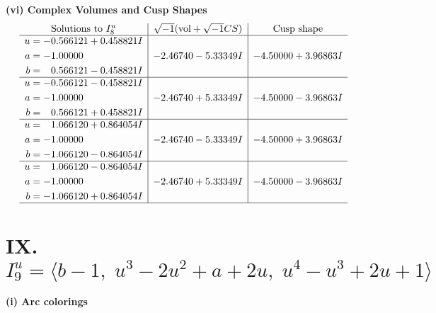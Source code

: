 \documentclass[1p]{elsarticle_modified}
\theoremstyle{definition}
\newcommand{\I}{\sqrt{-1}}
\begin{document}
\newpage\flushleft \textbf{(vi) Complex Volumes and Cusp Shapes}
$$\begin{array}{c|c|c}  
\text{Solutions to }I^u_{8}& \I (\text{vol} + \sqrt{-1}CS) & \text{Cusp shape}\\
 \hline 
\begin{aligned}
u &= -0.566121 + 0.458821 I \\
a &= -1.00000\phantom{ +0.000000I} \\
b &= \phantom{-}0.566121 - 0.458821 I\end{aligned}
 & -2.46740 - 5.33349 I & -4.50000 + 3.96863 I \\ \hline\begin{aligned}
u &= -0.566121 - 0.458821 I \\
a &= -1.00000\phantom{ +0.000000I} \\
b &= \phantom{-}0.566121 + 0.458821 I\end{aligned}
 & -2.46740 + 5.33349 I & -4.50000 - 3.96863 I \\ \hline\begin{aligned}
u &= \phantom{-}1.066120 + 0.864054 I \\
a &= -1.00000\phantom{ +0.000000I} \\
b &= -1.066120 - 0.864054 I\end{aligned}
 & -2.46740 - 5.33349 I & -4.50000 + 3.96863 I \\ \hline\begin{aligned}
u &= \phantom{-}1.066120 - 0.864054 I \\
a &= -1.00000\phantom{ +0.000000I} \\
b &= -1.066120 + 0.864054 I\end{aligned}
 & -2.46740 + 5.33349 I & -4.50000 - 3.96863 I\\
 \hline 
 \end{array}$$\newpage\newpage\renewcommand{\arraystretch}{1}
\centering \section*{IX. $I^u_{9}= \langle b-1,\;u^3-2 u^2+a+2 u,\;u^4- u^3+2 u+1 \rangle$}
\flushleft \textbf{(i) Arc colorings}\\
\end{document}
